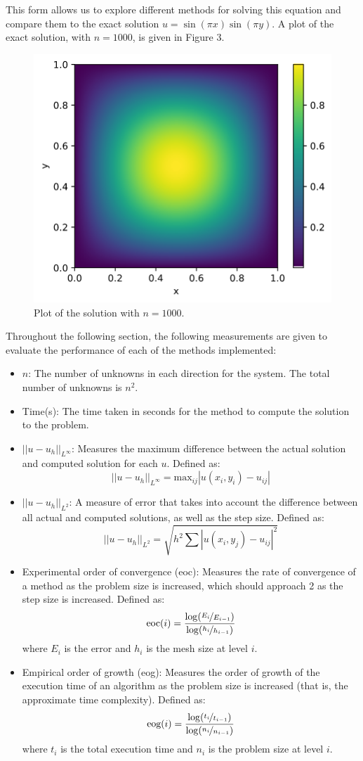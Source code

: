 \documentclass{article}
\numberwithin{equation}{section}
\begin{document}
This form allows us to explore different methods for solving this equation and compare them to the exact solution $u = \sin(\pi x) \sin(\pi y)$. A plot of the exact solution, with $n=1000$, is given in Figure 3. 

\begin{figure}[H]
\includegraphics[scale=.5]{img/solution2.png}
\centering
\caption{Plot of the solution with $n=1000$.}
\end{figure} 

Throughout the following section, the following measurements are given to evaluate the performance of each of the methods implemented:
\begin{itemize}
\item $n$: The number of unknowns in each direction for the system. The total number of unknowns is $n^2$.
\item Time(s): The time taken in seconds for the method to compute the solution to the problem.
\item $|| u - u_h ||_{L^\infty} $: Measures the maximum difference between the actual solution and computed solution for each $u$. Defined as:
 \[ || u - u_h ||_{L^\infty} = \text{max}_{ij} | u(x_i, y_i) - u_{ij} | \]
\item $|| u - u_h ||_{L^2} $: A measure of error that takes into account the difference between all actual and computed solutions, as well as the step size. Defined as:
\[ || u - u_h ||_{L^2} = \sqrt{h^2 \sum | u(x_i,y_j) - u_{ij} |^2} \]
\item Experimental order of convergence (eoc): Measures the rate of convergence of a method as the problem size is increased, which should approach 2 as the step size is increased. Defined as:
\[ \text{eoc}(i) = \frac{\log(\nicefrac{E_i}{E_{i-1}})}{\log(\nicefrac{h_i}{h_{i-1}})} \]
where $E_i$ is the error and $h_i$ is the mesh size at level $i$. 
\item Empirical order of growth (eog): Measures the order of growth of the execution time of an algorithm as the problem size is increased (that is, the approximate time complexity). Defined as:
\[ \text{eog}(i) = \frac{\log(\nicefrac{t_{i}}{t_{i-1}})}{\log(\nicefrac{n_{i}}{n_{i-1}})} \]
where $t_i$ is the total execution time and $n_i$ is the problem size at level $i$.
\end{itemize}
\end{document}
